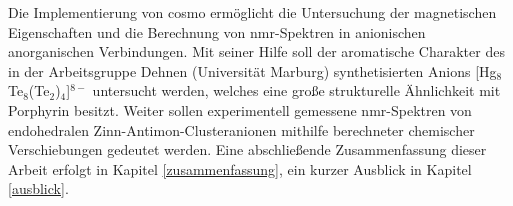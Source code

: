 Die Implementierung von \ac{cosmo} ermöglicht die Untersuchung der magnetischen Eigenschaften und die Berechnung von \ac{nmr}-Spektren in anionischen anorganischen Verbindungen. Mit seiner Hilfe soll der aromatische Charakter des in der Arbeitsgruppe Dehnen (Universität Marburg) synthetisierten Anions [Hg$_8$Te$_8$(Te$_2$)$_4$]$^{8-}$ untersucht werden, welches eine große strukturelle Ähnlichkeit mit Porphyrin besitzt. Weiter sollen experimentell gemessene \ac{nmr}-Spektren von endohedralen Zinn-Antimon-Clusteranionen mithilfe berechneter chemischer Verschiebungen gedeutet werden. Eine abschließende Zusammenfassung dieser Arbeit erfolgt in Kapitel \ref{zusammenfassung}, ein kurzer Ausblick in Kapitel \ref{ausblick}.



